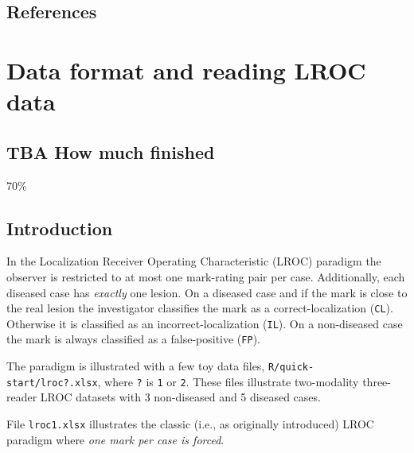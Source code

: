 \documentclass[
]{book}
\begin{document}
\hypertarget{quick-start-froc-data-format-references}{%
\section{References}\label{quick-start-froc-data-format-references}}

\hypertarget{quick-start-lroc-data}{%
\chapter{Data format and reading LROC data}\label{quick-start-lroc-data}}

\hypertarget{quick-start-lroc-data-how-much-finished}{%
\section{TBA How much finished}\label{quick-start-lroc-data-how-much-finished}}

70\%

\hypertarget{quick-start-lroc-data-intro}{%
\section{Introduction}\label{quick-start-lroc-data-intro}}

In the Localization Receiver Operating Characteristic (LROC) paradigm \citep{starr1977comments, starr1975visual, swensson1996unified} the observer is restricted to at most one mark-rating pair per case. Additionally, each diseased case has \emph{exactly} one lesion. On a diseased case and if the mark is close to the real lesion the investigator classifies the mark as a correct-localization (\texttt{CL}). Otherwise it is classified as an incorrect-localization (\texttt{IL}). On a non-diseased case the mark is always classified as a false-positive (\texttt{FP}).

The paradigm is illustrated with a few toy data files, \texttt{R/quick-start/lroc?.xlsx}, where \texttt{?} is \texttt{1} or \texttt{2}. These files illustrate two-modality three-reader LROC datasets with 3 non-diseased and 5 diseased cases.

File \texttt{lroc1.xlsx} illustrates the classic (i.e., as originally introduced) LROC paradigm where \emph{one mark per case is forced}.
\end{document}
